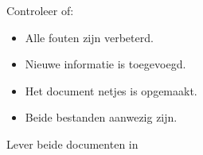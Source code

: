 Controleer of:
\begin{itemize}
\item Alle fouten zijn verbeterd.
\item Nieuwe informatie is toegevoegd.
\item Het document netjes is opgemaakt.
\item Beide bestanden aanwezig zijn.
\end{itemize}

Lever beide documenten in

